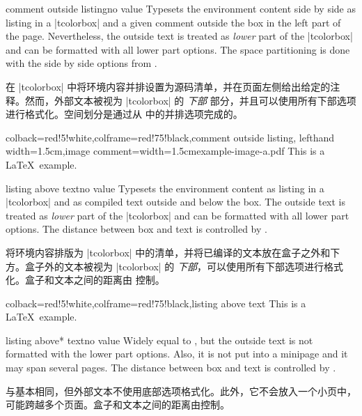 \begin{docTcbKey}{comment outside listing}{}{no value}
Typesets the environment content side by side as listing in a |tcolorbox|
and a given comment outside the box in the left part of the page.
Nevertheless, the outside text is treated as \emph{lower} part of the
|tcolorbox| and can be formatted with all lower part options.
The space partitioning is done with the side by side options from
.

在 |tcolorbox| 中将环境内容并排设置为源码清单，并在页面左侧给出给定的注释。然而，外部文本被视为 |tcolorbox| 的 \emph{下部} 部分，并且可以使用所有下部选项进行格式化。空间划分是通过从  中的并排选项完成的。
\begin{dispExample}
\begin{tcblisting}{colback=red!5!white,colframe=red!75!black,comment outside listing,
lefthand width=1.5cm,image comment={width=1.5cm}{example-image-a.pdf}}
This is a \LaTeX\ example.
\end{tcblisting}
\end{dispExample}
\end{docTcbKey}



\begin{docTcbKey}{listing above text}{}{no value}
Typesets the environment content as listing in a |tcolorbox|
and as compiled text outside and below the box.
The outside text is treated as \emph{lower} part of the
|tcolorbox| and can be formatted with all lower part options.
The distance between box and text is controlled by .

将环境内容排版为 |tcolorbox| 中的清单，并将已编译的文本放在盒子之外和下方。盒子外的文本被视为 |tcolorbox| 的 \emph{下部}，可以使用所有下部选项进行格式化。盒子和文本之间的距离由  控制。
\begin{dispExample}
\begin{tcblisting}{colback=red!5!white,colframe=red!75!black,listing above text}
This is a \LaTeX\ example.
\end{tcblisting}
\end{dispExample}
\end{docTcbKey}


\begin{docTcbKey}[][doc new=2014-11-07]{listing above* text}{}{no value}
Widely equal to , but the outside text is
not formatted with the lower part options.
Also, it is not put into a minipage and it may span several pages.
The distance between box and text is controlled by .

与基本相同，但外部文本不使用底部选项格式化。此外，它不会放入一个小页中，可能跨越多个页面。盒子和文本之间的距离由控制。
\end{docTcbKey}

